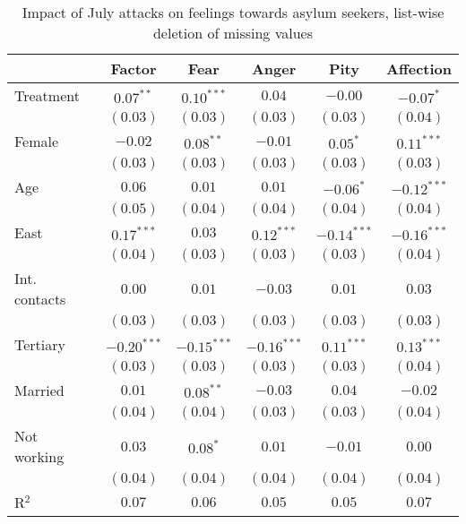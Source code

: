 
\begin{table}
\caption{Impact of July attacks on feelings towards asylum seekers, list-wise deletion of missing values}
\begin{center}
\begin{tabular}{l c c c c c}
\toprule
 & Factor & Fear & Anger & Pity & Affection \\
\midrule
Treatment     & $0.07^{**}$   & $0.10^{***}$  & $0.04$        & $-0.00$       & $-0.07^{*}$   \\
              & $(0.03)$      & $(0.03)$      & $(0.03)$      & $(0.03)$      & $(0.04)$      \\
Female        & $-0.02$       & $0.08^{**}$   & $-0.01$       & $0.05^{*}$    & $0.11^{***}$  \\
              & $(0.03)$      & $(0.03)$      & $(0.03)$      & $(0.03)$      & $(0.03)$      \\
Age           & $0.06$        & $0.01$        & $0.01$        & $-0.06^{*}$   & $-0.12^{***}$ \\
              & $(0.05)$      & $(0.04)$      & $(0.04)$      & $(0.04)$      & $(0.04)$      \\
East          & $0.17^{***}$  & $0.03$        & $0.12^{***}$  & $-0.14^{***}$ & $-0.16^{***}$ \\
              & $(0.04)$      & $(0.03)$      & $(0.03)$      & $(0.03)$      & $(0.04)$      \\
Int. contacts & $0.00$        & $0.01$        & $-0.03$       & $0.01$        & $0.03$        \\
              & $(0.03)$      & $(0.03)$      & $(0.03)$      & $(0.03)$      & $(0.03)$      \\
Tertiary      & $-0.20^{***}$ & $-0.15^{***}$ & $-0.16^{***}$ & $0.11^{***}$  & $0.13^{***}$  \\
              & $(0.03)$      & $(0.03)$      & $(0.03)$      & $(0.03)$      & $(0.04)$      \\
Married       & $0.01$        & $0.08^{**}$   & $-0.03$       & $0.04$        & $-0.02$       \\
              & $(0.04)$      & $(0.04)$      & $(0.03)$      & $(0.03)$      & $(0.04)$      \\
Not working   & $0.03$        & $0.08^{*}$    & $0.01$        & $-0.01$       & $0.00$        \\
              & $(0.04)$      & $(0.04)$      & $(0.04)$      & $(0.04)$      & $(0.04)$      \\
\midrule
R$^2$         & $0.07$        & $0.06$        & $0.05$        & $0.05$        & $0.07$        \\

\end{tabular}
\end{center}
\end{table}
